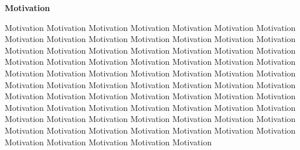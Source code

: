 \begin{center} \textbf{\huge Motivation} \end{center}
Motivation Motivation Motivation Motivation Motivation Motivation Motivation Motivation Motivation Motivation Motivation Motivation Motivation Motivation Motivation Motivation Motivation Motivation Motivation Motivation Motivation Motivation Motivation Motivation Motivation Motivation Motivation Motivation Motivation Motivation Motivation Motivation Motivation Motivation Motivation Motivation  Motivation Motivation Motivation Motivation Motivation Motivation Motivation Motivation Motivation Motivation Motivation Motivation Motivation Motivation Motivation Motivation  Motivation Motivation Motivation Motivation Motivation Motivation Motivation Motivation Motivation Motivation Motivation Motivation Motivation Motivation Motivation Motivation  Motivation Motivation Motivation Motivation Motivation Motivation Motivation 
